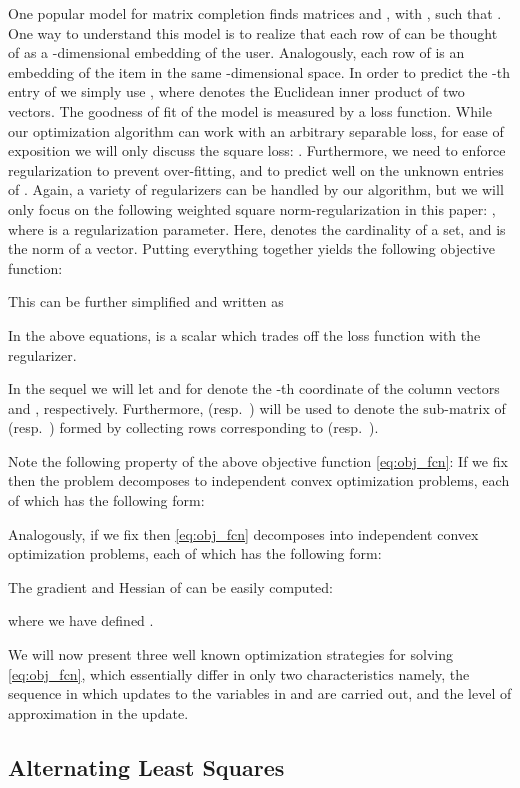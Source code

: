 \documentclass{vldb}
\begin{document}
One popular model for matrix completion finds matrices  and , with , such
that .  One way to understand this model is to
realize that each row  of  can be thought
of as a -dimensional embedding of the user. Analogously, each row
 of  is an embedding of the item in the
same -dimensional space. In order to predict the -th entry of
 we simply use , where
 denotes the Euclidean inner product of two
vectors. The goodness of fit of the model is measured by a loss
function. While our optimization algorithm can work with an arbitrary
separable loss, for ease of exposition we will only discuss the square
loss: . Furthermore, we need to enforce
regularization to prevent over-fitting, and to predict well on the
unknown entries of . Again, a variety of regularizers can be handled
by our algorithm, but we will only focus on the following weighted
square norm-regularization in this paper: , where
 is a regularization parameter.  Here,  denotes
the cardinality of a set, and  is the  norm of a
vector. Putting everything together yields the following objective
function:

This can be further simplified and written as 

In the above equations,  is a scalar which trades off the
loss function with the regularizer.

In the sequel we will let  and  for 
denote the -th coordinate of the column vectors  and ,
respectively.  Furthermore,  (resp.\ )
will be used to denote the sub-matrix of  (resp.\ ) formed by
collecting rows corresponding to  (resp.\ ).

Note the following property of the above objective function
\eqref{eq:obj_fcn}: If we fix  then the problem decomposes to 
independent convex optimization problems, each of which has the
following form:

Analogously, if we fix  then \eqref{eq:obj_fcn} decomposes into
 independent convex optimization problems, each of which has the
following form:

The gradient and Hessian of  can be easily computed:

where we have defined
.

We will now present three well known optimization strategies for solving
\eqref{eq:obj_fcn}, which essentially differ in only two characteristics
namely, the sequence in which updates to the variables in  and 
are carried out, and the level of approximation in the update.

\subsection{Alternating Least Squares}
\label{sec:AlternLeastSquar}
\end{document}
